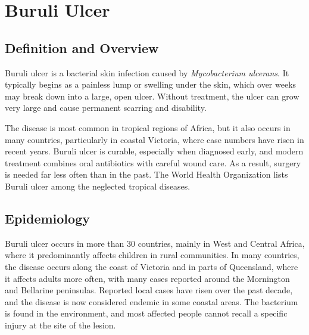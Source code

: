 \chapter{Buruli Ulcer}

\section*{Definition and Overview}
Buruli ulcer is a bacterial skin infection caused by \textit{Mycobacterium ulcerans}. It typically begins as a painless lump or swelling under the skin, which over weeks may break down into a large, open ulcer. Without treatment, the ulcer can grow very large and cause permanent scarring and disability.

The disease is most common in tropical regions of Africa, but it also occurs in many countries, particularly in coastal Victoria, where case numbers have risen in recent years. Buruli ulcer is curable, especially when diagnosed early, and modern treatment combines oral antibiotics with careful wound care. As a result, surgery is needed far less often than in the past. The World Health Organization lists Buruli ulcer among the neglected tropical diseases.

\section*{Epidemiology}
Buruli ulcer occurs in more than 30 countries, mainly in West and Central Africa, where it predominantly affects children in rural communities. In many countries, the disease occurs along the coast of Victoria and in parts of Queensland, where it affects adults more often, with many cases reported around the Mornington and Bellarine peninsulas. Reported local cases have risen over the past decade, and the disease is now considered endemic in some coastal areas. The bacterium is found in the environment, and most affected people cannot recall a specific injury at the site of the lesion.

